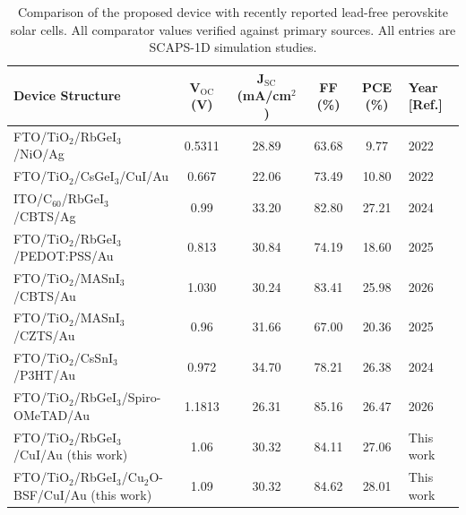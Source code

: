 \documentclass[review]{elsarticle}
\begin{document}
\begin{table}[htbp]
\centering
{\scriptsize\setlength{\tabcolsep}{2pt}
\begin{tabularx}{\textwidth}{XccccX}
\hline
Device Structure & V$_{\mathrm{OC}}$ (V) & J$_{\mathrm{SC}}$ (mA/cm$^{2}$) & FF (\%) & PCE (\%) & Year [Ref.]
\\\hline
FTO/\allowbreak{}TiO$_{2}$/RbGeI$_{3}$/NiO/\allowbreak{}Ag & 0.5311 & 28.89 & 63.68 & 9.77 & 2022 \cite{r14}\\
FTO/\allowbreak{}TiO$_{2}$/CsGeI$_{3}$/CuI/\allowbreak{}Au & 0.667 & 22.06 & 73.49 & 10.80 & 2022 \cite{r24}\\
ITO/\allowbreak{}C$_{60}$/RbGeI$_{3}$/CBTS/\allowbreak{}Ag & 0.99 & 33.20 & 82.80 & 27.21 & 2024 \cite{r22}\\
FTO/\allowbreak{}TiO$_{2}$/RbGeI$_{3}$/PEDOT:PSS/\allowbreak{}Au & 0.813 & 30.84 & 74.19 & 18.60 & 2025 \cite{r39}\\
FTO/\allowbreak{}TiO$_{2}$/MASnI$_{3}$/CBTS/\allowbreak{}Au & 1.030 & 30.24 & 83.41 & 25.98 & 2026 \cite{r41}\\
FTO/\allowbreak{}TiO$_{2}$/MASnI$_{3}$/CZTS/Au & 0.96 & 31.66 & 67.00 & 20.36 & 2025 \cite{r42}\\
FTO/\allowbreak{}TiO$_{2}$/CsSnI$_{3}$/P3HT/Au & 0.972 & 34.70 & 78.21 & 26.38 & 2024 \cite{r40}\\
FTO/\allowbreak{}TiO$_{2}$/RbGeI$_{3}$/Spiro-OMeTAD/\allowbreak{}Au & 1.1813 & 26.31 & 85.16 & 26.47 & 2026 \cite{r23}\\
FTO/\allowbreak{}TiO$_{2}$/RbGeI$_{3}$/CuI/\allowbreak{}Au (this work) & 1.06 & 30.32 & 84.11 & 27.06 & This work\\
FTO/\allowbreak{}TiO$_{2}$/RbGeI$_{3}$/Cu$_{2}$O-BSF/CuI/\allowbreak{}Au (this work) & 1.09 & 30.32 & 84.62 & 28.01 & This work\\
\hline
\end{tabularx}
}
\caption{Comparison of the proposed device with recently reported lead-free perovskite solar cells. All comparator values verified against primary sources. All entries are SCAPS-1D simulation studies.}
\end{table}
\end{document}
